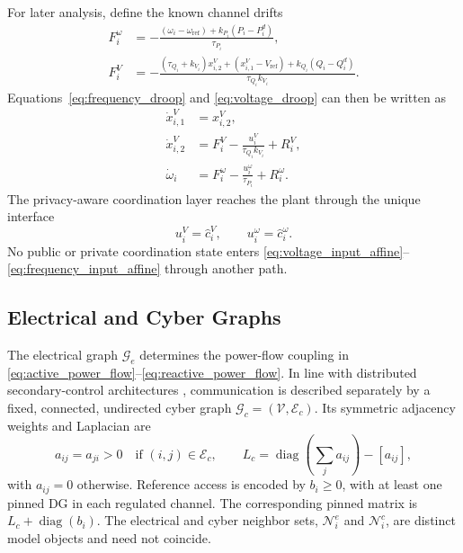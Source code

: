 \documentclass[journal]{IEEEtran}
\begin{document}
For later analysis, define the known channel drifts
\begin{align}
F_i^\omega
&=-\frac{(\omega_i-\omega_{\mathrm{ref}})
+k_{P_i}(P_i-P_i^d)}{\tau_{P_i}},
\label{eq:frequency_drift}\\
F_i^V
&=-\frac{(\tau_{Q_i}+k_{V_i})x_{i,2}^V
+(x_{i,1}^V-V_{\mathrm{ref}})
+k_{Q_i}(Q_i-Q_i^d)}{\tau_{Q_i}k_{V_i}}.
\label{eq:voltage_drift}
\end{align}
Equations~\eqref{eq:frequency_droop} and \eqref{eq:voltage_droop} can then be written as
\begin{align}
\dot x_{i,1}^V&=x_{i,2}^V,\nonumber\\
\dot x_{i,2}^V&=F_i^V-\frac{u_i^V}{\tau_{Q_i}k_{V_i}}+R_i^V,
\label{eq:voltage_input_affine}\\
\dot\omega_i&=F_i^\omega-\frac{u_i^\omega}{\tau_{P_i}}+R_i^\omega.
\label{eq:frequency_input_affine}
\end{align}
The privacy-aware coordination layer reaches the plant through the unique interface
\begin{equation}
u_i^V=\widehat c_i^V,
\qquad
u_i^\omega=\widehat c_i^\omega.
\label{eq:plant_interface}
\end{equation}
No public or private coordination state enters \eqref{eq:voltage_input_affine}--\eqref{eq:frequency_input_affine} through another path.

\subsection{Electrical and Cyber Graphs}

The electrical graph $\mathcal G_e$ determines the power-flow coupling in \eqref{eq:active_power_flow}--\eqref{eq:reactive_power_flow}. In line with distributed secondary-control architectures \cite{Lantao2019,Bu2025}, communication is described separately by a fixed, connected, undirected cyber graph $\mathcal G_c=(\mathcal V,\mathcal E_c)$. Its symmetric adjacency weights and Laplacian are
\begin{equation}
a_{ij}=a_{ji}>0\quad\text{if }(i,j)\in\mathcal E_c,
\qquad
L_c=\operatorname{diag}\!\left(\sum_j a_{ij}\right)-[a_{ij}],
\label{eq:cyber_graph}
\end{equation}
with $a_{ij}=0$ otherwise. Reference access is encoded by $b_i\geq0$, with at least one pinned DG in each regulated channel. The corresponding pinned matrix is $L_c+\operatorname{diag}(b_i)$. The electrical and cyber neighbor sets, $\mathcal N_i^e$ and $\mathcal N_i^c$, are distinct model objects and need not coincide.
\end{document}
